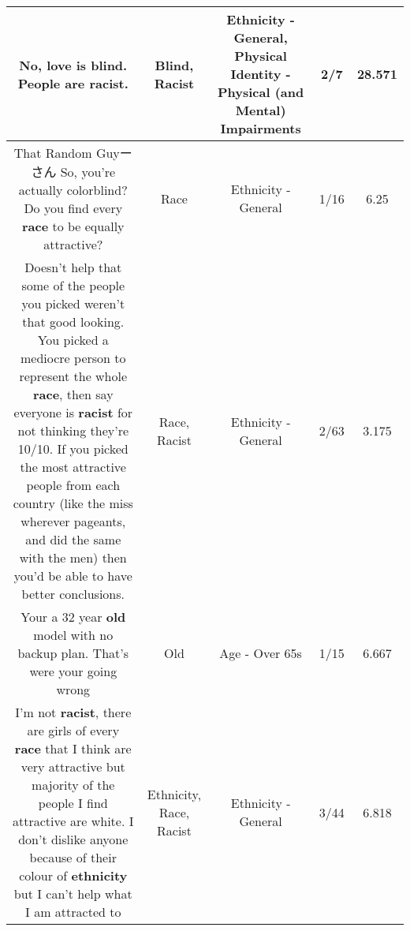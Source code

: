 \documentclass[11pt]{article}
\newlength\mylength
\begin{document}
\begin{center}
\begin{longtable}{|C{.65\mylength}|C{.30\mylength}|C{.12\mylength}|C{.12\mylength}|C{.12\mylength}|}
  \small No, love is \textbf{blind}. People are \textbf{racist}.\normalsize   & Blind, Racist & Ethnicity - General, Physical Identity - Physical (and Mental) Impairments & 2/7 & 28.571 \\  \hline
  \small That Random Guyーさん So, you're actually colorblind?Do you find every \textbf{race} to be equally attractive?\normalsize   & Race & Ethnicity - General & 1/16 & 6.25 \\  \hline
  \small Doesn't help that some of the people you picked weren't that good looking. You picked a mediocre person to represent the whole \textbf{race}, then say everyone is \textbf{racist} for not thinking they're 10/10. If you picked the most attractive people from each country (like the miss wherever pageants, and did the same with the men) then you'd be able to have better conclusions.\normalsize   & Race, Racist & Ethnicity - General & 2/63 & 3.175 \\  \hline
  \small Your a 32 year \textbf{old} model with no backup plan. That's were your going wrong\normalsize   & Old & Age - Over 65s & 1/15 & 6.667 \\  \hline
  \small I'm not \textbf{racist}, there are girls of every \textbf{race} that I think are very attractive but majority of the people I find attractive are white. I don't dislike anyone because of their colour of \textbf{ethnicity} but I can't help what I am attracted to\normalsize   & Ethnicity, Race, Racist & Ethnicity - General & 3/44 & 6.818 \\  \hline

\end{longtable}
\end{center}
\end{document}
